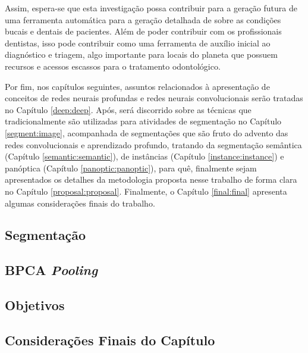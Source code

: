 Assim, espera-se que esta investigação possa contribuir para a geração futura de uma ferramenta automática para a geração detalhada de sobre as condições bucais e dentais de pacientes. Além de poder contribuir com os profissionais dentistas, isso pode contribuir como uma ferramenta de auxílio inicial ao diagnóstico e triagem, algo importante para locais do planeta que possuem recursos e acessos escassos para o tratamento odontológico.

Por fim, nos capítulos seguintes, assuntos relacionados à apresentação de conceitos de redes neurais profundas e redes neurais convolucionais serão tratadas no Capítulo \ref{deep:deep}. Após, será discorrido sobre as técnicas que tradicionalmente são utilizadas para atividades de segmentação no Capítulo \ref{segment:image}, acompanhada de segmentações que são fruto do advento das redes convolucionais e aprendizado profundo, tratando da segmentação semântica (Capítulo \ref{semantic:semantic}), de instâncias (Capítulo \ref{instance:instance}) e panóptica (Capítulo \ref{panoptic:panoptic}), para quê, finalmente sejam apresentados os detalhes da metodologia proposta nesse trabalho de forma clara no Capítulo \ref{proposal:proposal}.  Finalmente, o Capítulo \ref{final:final} apresenta algumas considerações finais do trabalho.

\subsection{Segmentação}
\label{intro:segment}

\subsection{BPCA \textit{Pooling}}
\label{intro:pooling}

\subsection{Objetivos}
\label{intro:objective}

\subsection{Considerações Finais do Capítulo}
\label{intro:end}